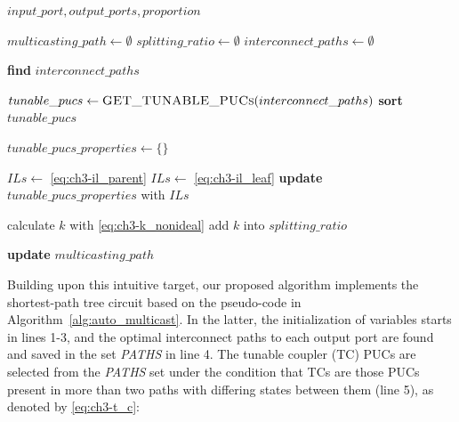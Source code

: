 \begin{algorithm}[h]
    \footnotesize
    \caption{Pseudo-code of Multicasting Application}
    \label{alg:auto_multicast}
    \begin{algorithmic}[1]
        \Require $input\_port, output\_ports, proportion$

        \State $multicasting\_path \gets \emptyset$
        \State $splitting\_ratio \gets \emptyset$
        \State $interconnect\_paths \gets \emptyset$

        \State \textbf{find} $interconnect\_paths$ 

        \State $tunable\_pucs \gets \Call{GET\_TUNABLE\_PUCs}{interconnect\_paths}$
        \State \textbf{sort} $tunable\_pucs$ 

        \State $tunable\_pucs\_properties \gets \{\}$

        \State $ILs \gets$ \eqref{eq:ch3-il_parent}
        \Else
        \State $ILs \gets$ \eqref{eq:ch3-il_leaf}
        \EndIf
        \State \textbf{update} $tunable\_pucs\_properties$ with $ILs$
        \EndFor

        \State calculate $k$ with \eqref{eq:ch3-k_nonideal} 
        \State add $k$ into $splitting\_ratio$
        \EndFor

        \State \textbf{update} $multicasting\_path$ 

    \end{algorithmic}
\end{algorithm}
Building upon this intuitive target, our proposed algorithm implements the shortest-path tree circuit based on the pseudo-code in Algorithm~\ref{alg:auto_multicast}.
In the latter, the initialization of variables starts in lines 1-3, and the optimal interconnect paths to each output port are found and saved in the set \textit{PATHS} in line 4.
The tunable coupler (TC) PUCs are selected from the \textit{PATHS} set under the condition that TCs are those PUCs present in more than two paths with differing states between them (line 5),
as denoted by \eqref{eq:ch3-t_c}:

